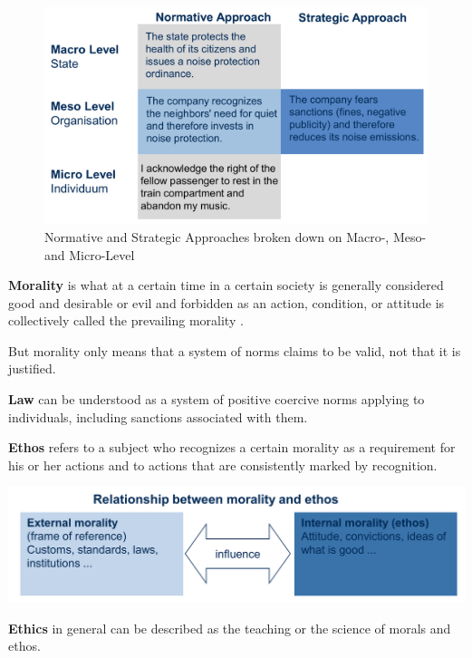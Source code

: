 \documentclass[11pt]{article}
\theoremstyle{definition}
\begin{document}
\begin{figure}[tbh]
	\centering
	\includegraphics[width=0.6\linewidth]{img/ethics_approach}
	\caption{Normative and Strategic Approaches broken down on Macro-, Meso- and Micro-Level}
	\label{fig:ethicsapproach}
\end{figure}

\begin{definition}
	\textbf{Morality} is what at a certain time in a certain society is generally considered good and desirable or evil and forbidden as an action, condition, or attitude is collectively called the prevailing morality \parencite{gobel2013unternehmensethik}.
	
	But morality only means that a system of norms claims to be valid, not that it is justified.
\end{definition}

\begin{definition}
	\textbf{Law} can be understood as a system of positive coercive norms applying to individuals, including sanctions associated with them.
\end{definition}

\begin{definition}
	\textbf{Ethos} refers to a subject who recognizes a certain morality as a requirement for his or her actions and to actions that are consistently marked by recognition.
\end{definition}

\begin{center}
	\includegraphics[width=0.8\linewidth]{img/ethos}
\end{center}

\begin{definition}
	\textbf{Ethics} in general can be described as the teaching or the science of morals and ethos.
\end{definition}
\end{document}
